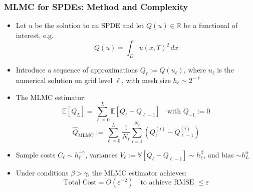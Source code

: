 \documentclass[aspectratio=169]{beamer}
\begin{document}
\begin{frame}
  \frametitle{MLMC for SPDEs: Method and Complexity}

  \begin{itemize}
    \item Let \( u \) be the solution to an SPDE and let \( Q(u) \in \mathbb{R} \) be a functional of interest, e.g.
    \[
      Q(u) = \int_D u(x,T)^2 \, dx
    \]

    \item Introduce a sequence of approximations \( Q_\ell := Q(u_\ell) \), where \( u_\ell \) is the numerical solution on grid level \( \ell \), with mesh size \( h_\ell \sim 2^{-\ell} \)

    \item The MLMC estimator:
    \[
      \mathbb{E}[Q_L] = \sum_{\ell = 0}^L \mathbb{E}[Q_\ell - Q_{\ell-1}]
    \quad \text{with } Q_{-1} := 0
    \]
    \[
      \hat{Q}_{\text{MLMC}} := \sum_{\ell=0}^L \frac{1}{N_\ell} \sum_{i=1}^{N_\ell} \left( Q_\ell^{(i)} - Q_{\ell-1}^{(i)} \right)
    \]

    \item Sample costs \( C_\ell \sim h_\ell^{-\gamma} \), variances \( V_\ell := \mathbb{V}[Q_\ell - Q_{\ell-1}] \sim h_\ell^\beta \), and bias \( \sim h_L^\alpha \)

    \item Under conditions \( \beta > \gamma \), the MLMC estimator achieves:
    \[
      \boxed{\text{Total Cost} = O(\varepsilon^{-2}) \quad \text{to achieve RMSE } \leq \varepsilon}
    \]
  \end{itemize}
\end{frame}
\end{document}

